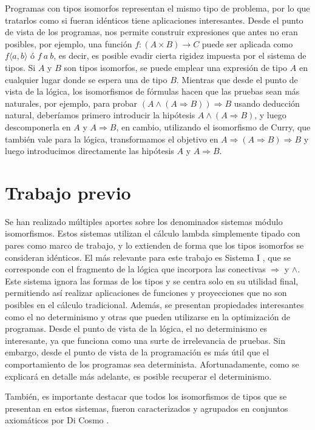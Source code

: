 Programas con tipos isomorfos representan el mismo tipo de problema, por lo que tratarlos como si fueran idénticos tiene aplicaciones interesantes.
Desde el punto de vista de los programas, nos permite construir expresiones que antes no eran posibles, por ejemplo, una función $f : (A \times B) \rightarrow C$ puede ser aplicada como $f \langle a, b \rangle$ ó $f \: a \: b$, es decir, es posible evadir cierta rigidez impuesta por el sistema de tipos.
Si $A$ y $B$ son tipos isomorfos, se puede emplear una expresión de tipo $A$ en cualquier lugar donde se espera una de tipo $B$.
Mientras que desde el punto de vista de la lógica, los isomorfismos de fórmulas hacen que las pruebas sean más naturales, por ejemplo, para probar $(A \wedge (A \Rightarrow  B)) \Rightarrow B$ usando deducción natural, deberíamos primero introducir la hipótesis $A \wedge (A \Rightarrow B)$, y luego descomponerla en $A$ y $A \Rightarrow B$, en cambio, utilizando el isomorfismo de Curry, que también vale para la lógica, transformamos el objetivo en $A \Rightarrow (A \Rightarrow  B) \Rightarrow B$ y luego introducimos directamente las hipótesis $A$ y $A \Rightarrow B$.

\section{Trabajo previo}

Se han realizado múltiples aportes sobre los denominados sistemas módulo isomorfismos.
Estos sistemas utilizan el cálculo lambda simplemente tipado con pares como marco de trabajo, y lo extienden de forma que los tipos isomorfos se consideran idénticos.
El más relevante para este trabajo es Sistema I \cite{system-i}, que se corresponde con el fragmento de la lógica que incorpora las conectivas $\Rightarrow$ y $\wedge$.
Este sistema ignora las formas de los tipos y se centra solo en su utilidad final, permitiendo así realizar aplicaciones de funciones y proyecciones que no son posibles en el cálculo tradicional.
Además, se presentan propiedades interesantes como el no determinismo y otras que pueden utilizarse en la optimización de programas.
Desde el punto de vista de la lógica, el no determinismo es interesante, ya que funciona como una surte de irrelevancia de pruebas.
Sin embargo, desde el punto de vista de la programación es más útil que el comportamiento de los programas sea determinista.
Afortunadamente, como se explicará en detalle más adelante, es posible recuperar el determinismo.

También, es importante destacar que todos los isomorfismos de tipos que se presentan en estos sistemas, fueron caracterizados y agrupados en conjuntos axiomáticos por Di Cosmo \cite{MSCSSurvey05}.

